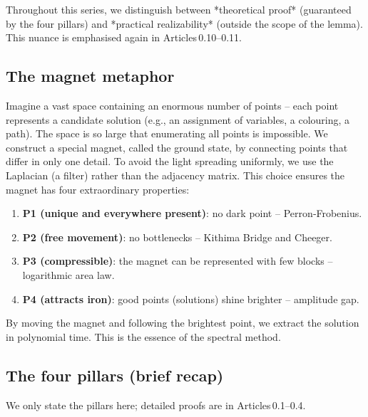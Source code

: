 \documentclass[11pt,a4paper]{article}
\begin{document}
Throughout this series, we distinguish between *theoretical proof* (guaranteed by the four pillars) and *practical realizability* (outside the scope of the lemma). This nuance is emphasised again in Articles 0.10–0.11.

\subsection{The magnet metaphor}

Imagine a vast space containing an enormous number of points – each point represents a candidate solution (e.g., an assignment of variables, a colouring, a path). The space is so large that enumerating all points is impossible. We construct a special magnet, called the ground state, by connecting points that differ in only one detail. To avoid the light spreading uniformly, we use the Laplacian (a filter) rather than the adjacency matrix. This choice ensures the magnet has four extraordinary properties:

\begin{enumerate}
\item \textbf{P1 (unique and everywhere present)}: no dark point – Perron‑Frobenius.
\item \textbf{P2 (free movement)}: no bottlenecks – Kithima Bridge and Cheeger.
\item \textbf{P3 (compressible)}: the magnet can be represented with few blocks – logarithmic area law.
\item \textbf{P4 (attracts iron)}: good points (solutions) shine brighter – amplitude gap.
\end{enumerate}

By moving the magnet and following the brightest point, we extract the solution in polynomial time. This is the essence of the spectral method.

\subsection{The four pillars (brief recap)}

We only state the pillars here; detailed proofs are in Articles 0.1–0.4.
\end{document}
